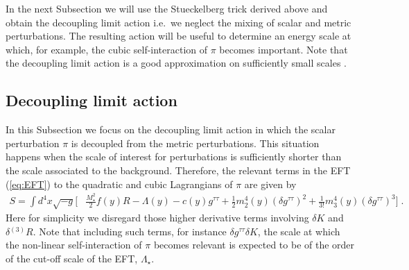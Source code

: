 \documentclass[a4paper,11pt]{article}
\numberwithin{equation}{section}
\begin{document}
In the next Subsection we will use the Stueckelberg trick derived above and obtain the decoupling limit action i.e.~we neglect the mixing of scalar and metric perturbations. The resulting action will be useful to determine an energy scale at which, for example, the cubic self-interaction of $\pi$ becomes important. Note that the decoupling limit action is a good approximation on sufficiently small scales \cite{Motohashi:2019ymr,Cheung:2007st}.

\subsection{Decoupling limit action}
In this Subsection we focus on the decoupling limit action in which the scalar perturbation $\pi$ is decoupled from the metric perturbations. This situation happens when the scale of interest for perturbations is sufficiently shorter than the scale associated to the background. Therefore, the relevant terms in the EFT (\ref{eq:EFT}) to the quadratic and cubic Lagrangians of $\pi$ are given by
\begin{align}\label{eq:EFT_decoupling}
S = \int d^4x \sqrt{-g} \bigg[&\frac{M_\star^2}{2}f(y)R - \Lambda(y) - c(y)g^{\tau\tau} + \frac{1}{2} m_2^4(y) (\delta g^{\tau\tau})^2 + \frac{1}{3!} m_3^4(y) (\delta g^{\tau\tau})^3  \bigg] \;.
\end{align}
Here for simplicity we disregard those higher derivative terms involving $\delta K$ and $\delta {}^{(3)}\!R$. 
Note that including such terms, for instance $\delta g^{\tau\tau} \delta K$, the scale at which the non-linear self-interaction of $\pi$ becomes relevant is expected to be of the order of the cut-off scale of the EFT, $\Lambda_\star$.  
\end{document}
